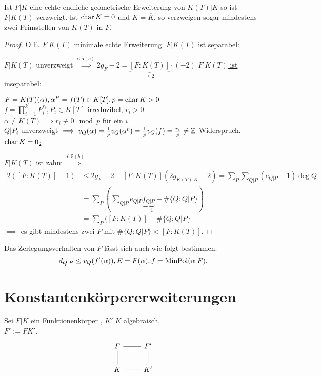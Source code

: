 \begin{korollar}
    Ist $F|K$ eine echte endliche geometrische Erweiterung von $K(T)|K$ so ist $F|K(T)$ verzweigt. Ist $\operatorname{char} K = 0$ und $K = \overline{K}$,
    so verzweigen sogar mindestens zwei Primstellen von $K(T)$ in $F$.
\end{korollar}
\begin{proof}
    O.E. $F|K(T)$ minimale echte Erweiterung.\nl
    \underline{$F|K(T)$ ist separabel:}

    $F|K(T)$ unverzweigt $\stackrel{6.5(c)}{\implies} 2g_F - 2 = \underbrace{[F:K(T)]}_{\geq 2} \cdot (-2)$\nl
    \underline{$F|K(T)$ ist inseparabel:} 
    
    $F = K(T)(\alpha), \alpha^P=f(T) \in K[T], p = \operatorname{char} K > 0$\\
    $f = \prod\limits_{i=1}^k P_i^{r_i}, P_i \in K[T]$ irreduzibel, $r_i >0$\\
    $\alpha \ne K(T) \implies r_i \not \equiv 0 \mod p$ für ein $i$\\
    $Q|P_i$ unverzweigt $\implies v_Q(\alpha) = \frac{1}{p} v_Q(\alpha^p) = \frac{1}{p}v_Q(f) = \frac{r_i}{p} \ne \mathbb{Z}$ Widerspruch.\nl
    \underline{$\operatorname{char} K = 0$:}

    $F|K(T)$ ist zahm $\stackrel{6.5(b)}{\implies}$
    \begin{align*}
        2([F:K(T)] - 1) & \leq 2 g_F - 2 - [F:K(T)](2g_{K(T)|K}-2) = \sum_P\sum_{Q|P}(e_{Q|P} - 1)\deg Q\\
        & = \sum_P(\sum_{Q|P} e_{Q|P}\underbrace{f_{Q|P}}_{=1} - \# \{Q:Q|P\})\\
        & = \sum_P( [F:K(T)] - \#\{Q:Q|P\}
    \end{align*}
    $\implies$ es gibt mindestens zwei $P$ mit $\#\{Q:Q|P\} < [F:K(T)]$.
\end{proof}

\begin{bemerkungnr}
    Das Zerlegungsverhalten von $P$ lässt sich auch wie folgt bestimmen:
    $$ d_{Q|P} \leq v_Q(f'(\alpha)), E=F(\alpha), f=\operatorname{MinPol}(\alpha|F).$$
\end{bemerkungnr}

\section{Konstantenkörpererweiterungen}
Sei $F|K$ ein Funktionenkörper , $K'|K$ algebraisch,\\
$F' := FK'$.
$$
\begin{tikzcd}
    F \rar[dash] \dar[dash] & F' \dar[dash]\\
    K \rar[dash] & K'
\end{tikzcd}
$$

